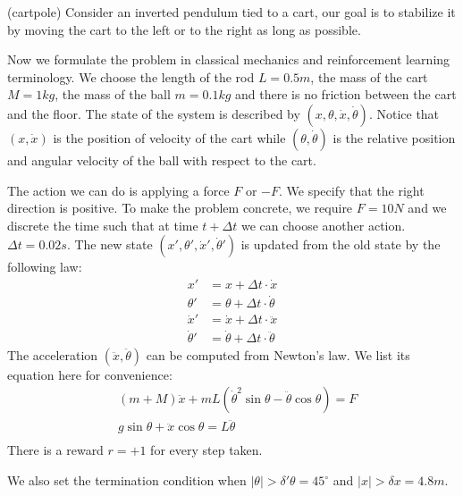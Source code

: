 \documentclass{article}
\begin{document}
(cartpole) Consider an inverted pendulum tied to a cart, our goal is to stabilize it by moving the cart
to the left or to the right as long as possible.

Now we formulate the problem in classical mechanics and reinforcement learning terminology.
We choose the length of the rod $L = 0.5 m$, the mass of the cart $M=1 kg$, the mass of the ball $m=0.1 kg$
and there is no friction between the cart and the floor.
The state of the system is described by
$(x, \theta, \dot{x}, \dot{\theta})$. Notice that $(x, \dot{x})$ is the position of velocity of the cart while
$(\theta, \dot{\theta})$ is the relative position and angular velocity of the ball with respect to the cart.

The action we can do is applying a force
$F$ or $-F$. We specify that the right direction is positive. To make the problem concrete,
we require $F=10N$ and we discrete the time such that at time $t+\Delta t$ we can choose another action.
$\Delta t = 0.02s$. The new state $(x', \theta', \dot{x}', \dot{\theta}')$ is updated from the old state by the following law:
\begin{align*}
x' &= x + \Delta t \cdot \dot{x} \\
\theta' &= \theta + \Delta t \cdot \dot{\theta} \\
\dot{x}' &= \dot{x} + \Delta t \cdot \ddot{x} \\
\dot{\theta}' &= \dot{\theta} + \Delta t \cdot \ddot{\theta}
\end{align*}
The acceleration $(\ddot{x}, \ddot{\theta})$ can be computed from Newton's law.
We list its equation here for convenience:
\begin{align*}
& (m + M)\ddot{x} + mL(\dot{\theta}^2 \sin \theta - \ddot{\theta} \cos \theta) = F \\
& g \sin \theta  + \ddot{x} \cos\theta = L \ddot{\theta}\\
\end{align*}
There is a reward $r=+1$ for every step taken.

We also set the termination condition when $|\theta| > \delta' \theta = 45^\circ$ and $|x| > \delta x = 4.8 m $.
\end{document}
